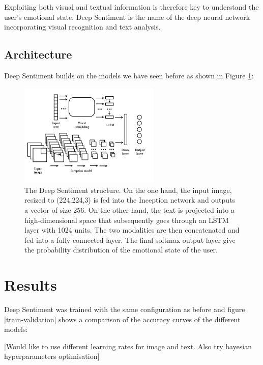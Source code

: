 \documentclass{article} %
\begin{document}
Exploiting both visual and textual information is therefore key to understand the user's emotional state. Deep Sentiment is the name of the deep neural network incorporating visual recognition and text analysis.

\subsection{Architecture}
Deep Sentiment builds on the models we have seen before as shown in Figure \ref{deep-sentiment}:

\begin{figure}[H]
    \centering
    \includegraphics[width=0.6\textwidth]{Images/deep-sentiment-structure.jpg}
    \caption{The Deep Sentiment structure. On the one hand, the input image, resized to (224,224,3) is fed into the Inception network and outputs a vector of size 256. On the other hand, the text is projected into a high-dimensional space that subsequently goes through an LSTM layer with 1024 units. The two modalities are then concatenated and fed into a fully connected layer. The final softmax output layer give the probability distribution of the emotional state of the user.}
    \label{deep-sentiment}
\end{figure}

\section{Results}
Deep Sentiment was trained with the same configuration as before and figure \ref{train-validation} shows a comparison of the accuracy curves of the different models:

[Would like to use different learning rates for image and text. Also try bayesian hyperparameters optimisation]
\end{document}

